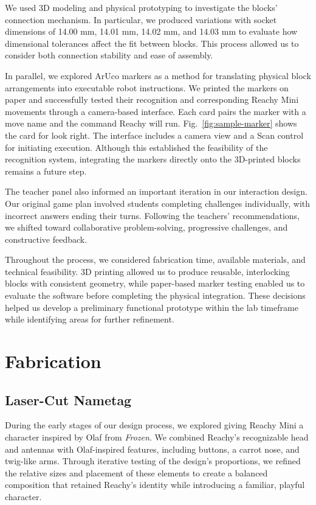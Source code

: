 \documentclass[conference]{IEEEtran}
\begin{document}
We used 3D modeling and physical prototyping to investigate the blocks' connection mechanism. In particular, we produced variations with socket dimensions of 14.00 mm, 14.01 mm, 14.02 mm, and 14.03 mm to evaluate how dimensional tolerances affect the fit between blocks. This process allowed us to consider both connection stability and ease of assembly.

In parallel, we explored ArUco markers as a method for translating physical block arrangements into executable robot instructions. We printed the markers on paper and successfully tested their recognition and corresponding Reachy Mini movements through a camera-based interface. Each card pairs the marker with a move name and the command Reachy will run. Fig.~\ref{fig:sample-marker} shows the card for look right. The interface includes a camera view and a Scan control for initiating execution. Although this established the feasibility of the recognition system, integrating the markers directly onto the 3D-printed blocks remains a future step.

The teacher panel also informed an important iteration in our interaction design. Our original game plan involved students completing challenges individually, with incorrect answers ending their turns. Following the teachers' recommendations, we shifted toward collaborative problem-solving, progressive challenges, and constructive feedback.

Throughout the process, we considered fabrication time, available materials, and technical feasibility. 3D printing allowed us to produce reusable, interlocking blocks with consistent geometry, while paper-based marker testing enabled us to evaluate the software before completing the physical integration. These decisions helped us develop a preliminary functional prototype within the lab timeframe while identifying areas for further refinement.



\section{Fabrication}

\subsection{Laser-Cut Nametag}

During the early stages of our design process, we explored giving Reachy Mini a character inspired by Olaf from \textit{Frozen}. We combined Reachy's recognizable head and antennas with Olaf-inspired features, including buttons, a carrot nose, and twig-like arms. Through iterative testing of the design's proportions, we refined the relative sizes and placement of these elements to create a balanced composition that retained Reachy's identity while introducing a familiar, playful character.
\end{document}
